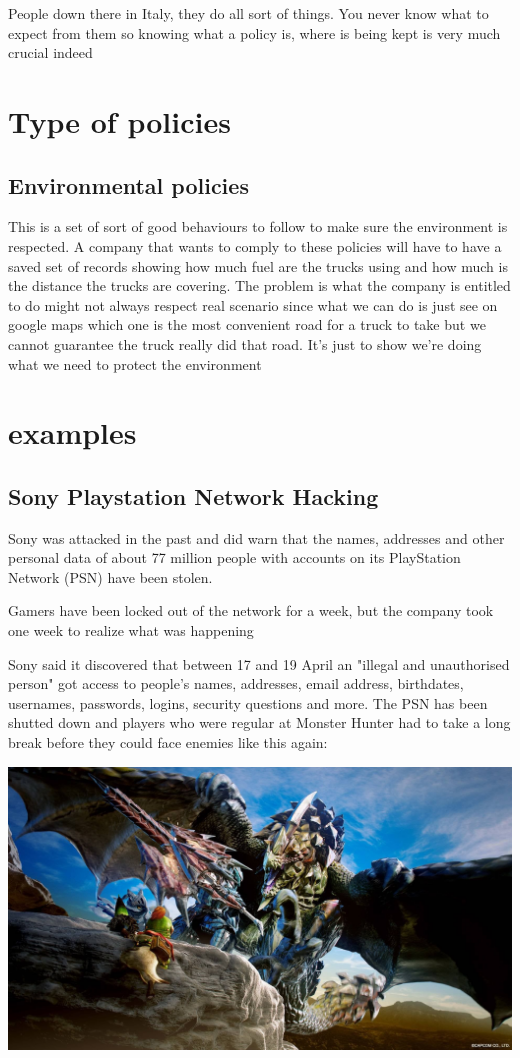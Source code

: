 \documentclass[a4paper,12pt]{article}
\begin{document}
People down there in Italy, they do all sort of things. You never know what to expect from them so knowing what a policy is, where is being kept is very much crucial indeed  


\section{Type of policies}
\subsection{Environmental policies}
This is a set of sort of good behaviours to follow to make sure the environment is respected. A company that wants to comply to these policies will have to have a saved set of records showing how much fuel are the trucks using and how much is the distance the trucks are covering. The problem is what the company is entitled to do might not always respect real scenario since what we can do is just see on google maps which one is the most convenient road for a truck to take but we cannot guarantee the truck really did that road. It's just to show we're doing what we need to protect the environment
\clearpage
\printindex

\section{examples}
\subsection{Sony Playstation Network Hacking}

Sony was attacked in the past and did warn that the names, addresses and other personal data of about 77 million people with accounts on its PlayStation Network (PSN) have been stolen.

Gamers have been locked out of the network for a week, but the company took one week to realize what was happening

Sony said it discovered that between 17 and 19 April an "illegal and unauthorised person" got access to people's names, addresses, email address, birthdates, usernames, passwords, logins, security questions and more. The PSN has been shutted down and players who were regular at Monster Hunter had to take a long break before they could face enemies like this again:

\includegraphics[width=15cm]{./seregios.jpg}
\end{document}
